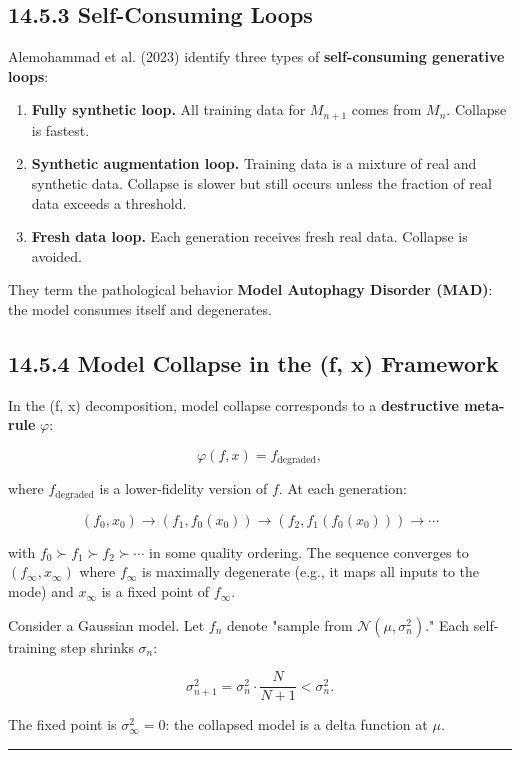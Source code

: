 \subsection{14.5.3 Self-Consuming Loops}

Alemohammad et al. (2023) identify three types of \textbf{self-consuming generative loops}:

\begin{enumerate}
  \item \textbf{Fully synthetic loop.} All training data for $M_{n+1}$ comes from $M_n$. Collapse is fastest.
  \item \textbf{Synthetic augmentation loop.} Training data is a mixture of real and synthetic data. Collapse is slower but still occurs unless the fraction of real data exceeds a threshold.
  \item \textbf{Fresh data loop.} Each generation receives fresh real data. Collapse is avoided.
\end{enumerate}

They term the pathological behavior \textbf{Model Autophagy Disorder (MAD)}: the model consumes itself and degenerates.

\subsection{14.5.4 Model Collapse in the (f, x) Framework}

In the (f, x) decomposition, model collapse corresponds to a \textbf{destructive meta-rule} $\varphi$:

\[
\varphi(f, x) = f_{\text{degraded}},
\]

where $f_{\text{degraded}}$ is a lower-fidelity version of $f$. At each generation:

\[
(f_0, x_0) \to (f_1, f_0(x_0)) \to (f_2, f_1(f_0(x_0))) \to \cdots
\]

with $f_0 \succ f_1 \succ f_2 \succ \cdots$ in some quality ordering. The sequence converges to $(f_\infty, x_\infty)$ where $f_\infty$ is maximally degenerate (e.g., it maps all inputs to the mode) and $x_\infty$ is a fixed point of $f_\infty$.

\begin{example}
Consider a Gaussian model. Let $f_n$ denote "sample from $\mathcal{N}(\mu, \sigma_n^2)$." Each self-training step shrinks $\sigma_n$:

\[
\sigma_{n+1}^2 = \sigma_n^2 \cdot \frac{N}{N + 1} < \sigma_n^2.
\]

The fixed point is $\sigma_\infty^2 = 0$: the collapsed model is a delta function at $\mu$.

\bigskip\hrule\bigskip
\end{example}

